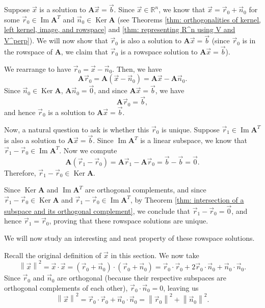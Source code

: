 \documentclass[]{book}
\DeclareMathOperator{\image}{Im}
\DeclareMathOperator{\kernel}{Ker}
\newcommand{\mat}[1]{\ensuremath{\mathbf{#1}}}
\newcommand{\R}{\ensuremath{\mathbb{R}}}
\begin{document}
Suppose $\vec{x}$ is a solution to $\mat{A}\vec{x} = \vec{b}$. Since $\vec{x} \in \R^n$, we know that $\vec{x} = \vec{r}_0 + \vec{n}_0$ for some $\vec{r}_0 \in \image\mat{A}^T$ and $\vec{n}_0 \in \kernel\mat{A}$ (see Theorems \ref{thm: orthogonalities of kernel, left kernel, image, and rowspace} and \ref{thm: representing R^n using V and V^perp}). We will now show that $\vec{r}_0$ is also a solution to $\mat{A}\vec{x} = \vec{b}$ (since $\vec{r}_0$ is in the rowspace of $\mat{A}$, we claim that $\vec{r}_0$ is a rowspace solution to $\mat{A}\vec{x} = \vec{b}$).

We rearrange to have $\vec{r}_0 = \vec{x} - \vec{n}_0$. Then, we have
\[\mat{A}\vec{r}_0 = \mat{A}(\vec{x} - \vec{n}_0) = \mat{A}\vec{x} - \mat{A}\vec{n}_0.\]
Since $\vec{n}_0 \in \kernel\mat{A}$, $\mat{A}\vec{n}_0 = \vec{0}$, and since $\mat{A}\vec{x} = \vec{b}$, we have
\[\mat{A}\vec{r}_0 = \vec{b},\]
and hence $\vec{r}_0$ is a solution to $\mat{A}\vec{x} = \vec{b}$.

Now, a natural question to ask is whether this $\vec{r}_0$ is unique. Suppose $\vec{r}_1 \in \image\mat{A}^T$ is also a solution to $\mat{A}\vec{x} = \vec{b}$. Since $\image\mat{A}^T$ is a linear subspace, we know that $\vec{r}_1 - \vec{r}_0 \in \image\mat{A}^T$. Now we compute
\[\mat{A}\left(\vec{r}_1 - \vec{r}_0\right) = \mat{A}\vec{r}_1 - \mat{A}\vec{r}_0 = \vec{b} - \vec{b} = \vec{0}.\]
Therefore, $\vec{r}_1 - \vec{r}_0 \in \kernel\mat{A}$. 

Since $\kernel\mat{A}$ and $\image\mat{A}^T$ are orthogonal complements, and since $\vec{r}_1 - \vec{r}_0 \in \kernel\mat{A}$ and $\vec{r}_1 - \vec{r}_0 \in \image\mat{A}^T$, by Theorem \ref{thm: intersection of a subspace and its orthogonal complement}, we conclude that $\vec{r}_1 - \vec{r}_0 = \vec{0}$, and hence $\vec{r}_1 = \vec{r}_0$, proving that these rowspace solutions are unique.

We will now study an interesting and neat property of these rowspace solutions.

Recall the original definition of $\vec{x}$ in this section. We now take
\[\left\|\vec{x}\right\|^2 = \vec{x} \cdot \vec{x} = \left(\vec{r}_0 + \vec{n}_0\right) \cdot \left(\vec{r}_0 + \vec{n}_0\right) = \vec{r}_0 \cdot \vec{r}_0 + 2\vec{r}_0\cdot\vec{n}_0 + \vec{n}_0 \cdot \vec{n}_0.\]
Since $\vec{r}_0$ and $\vec{n}_0$ are orthogonal (because their respective subspaces are orthogonal complements of each other), $\vec{r}_0 \cdot \vec{n}_0 = 0$, leaving us
\[\left\|\vec{x}\right\|^2 = \vec{r}_0 \cdot \vec{r}_0 + \vec{n}_0 \cdot \vec{n}_0 = \left\|\vec{r}_0\right\|^2 + \left\|\vec{n}_0\right\|^2.\]
\end{document}
